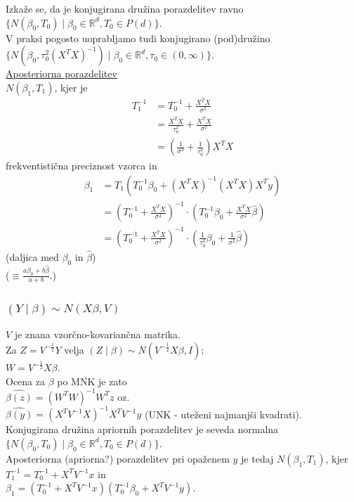 \documentclass[a4paper, 12pt]{book}
\theoremstyle{definition}
\theoremstyle{remark}
\newcommand{\R}{\mathbb{R}}
\begin{document}
Izkaže se, da je konjugirana družina porazdelitev ravno \\
$\{N(\beta_0, T_0) \mid \beta_0 \in \R^d, T_0 \in P(d)\}$. \\
V praksi pogosto uoprabljamo tudi konjugirano (pod)družino \\
$\{N\left(\beta_0, \tau_0^2 (X^T X)^{-1}\right) \mid \beta_0 \in \R^d, \tau_0 \in (0, \infty)\}$. \\
\underline{Aposteriorna porazdelitev} \\
$N(\beta_1, T_1)$, kjer je
\begin{align*}
  T_1^{-1} &= T_0^{-1} + \frac{X^T X}{\sigma^2} \\
  &= \frac{X^T X}{\tau_0^2} + \frac{X^T X}{\sigma^2} \\
  &= \left(\frac{1}{\sigma^2} + \frac{1}{\tau_0^2}\right) X^T X
\end{align*}
frekventistična preciznost vzorca in
\begin{align*}
  \beta_1 &= T_1 (T_0^{-1} \beta_0 + (X^T X)^{-1} (X^T X) X^T y) \\
  &= \left(T_0^{-1} + \frac{X^T X}{\sigma^2}\right)^{-1} \cdot
    \left(T_0^{-1} \beta_0 + \frac{X^T X}{\sigma^2} \hat{\beta}\right) \\
  &=  \left(T_0^{-1} + \frac{X^T X}{\sigma^2}\right)^{-1} \cdot
    \left(\frac{1}{\tau_0^2} \beta_0 + \frac{1}{\sigma^2} \hat{\beta}\right)
\end{align*}
(daljica med $\beta_0$ in $\hat{\beta}$) \\
($\equiv \frac{a \beta_0 + b \hat{\beta}}{a + b}$.)



\subsubsection{$(Y \mid \beta) \sim N(X \beta, V)$}

$V$ je znana vzorčno-kovariančna matrika. \\
Za $Z = V^{-\frac{1}{2}} Y$ velja $(Z \mid \beta) \sim N(V^{-\frac{1}{2}} X \beta, I)$; \\
$W = V^{-\frac{1}{2}} X \beta$. \\
Ocena za $\beta$ po MNK je zato \\
$\widehat{\beta(z)} = (W^T W)^{-1} W^T z$ oz. \\
$\widehat{\beta(y)} = (X^T V^{-1} X)^{-1} X^T V^{-1} y$ (UNK - uteženi najmanjši kvadrati). \\
Konjugirana družina apriornih porazdelitev je seveda normalna \\
$\{N(\beta_0, T_0) \mid \beta_0 \in \R^d, T_0 \in P(d)\}$. \\
Aposteriorna (apriorna?) porazdelitev pri opaženem $y$ je tedaj $N(\beta_1, T_1)$, kjer \\
$T_1^{-1} = T_0^{-1} + X^T V^{-1} x$ in \\
$\beta_1 = (T_0^{-1} + X^T V^{-1} x) (T_0^{-1} \beta_0 + X^T V^{-1} y)$. \\
\end{document}

